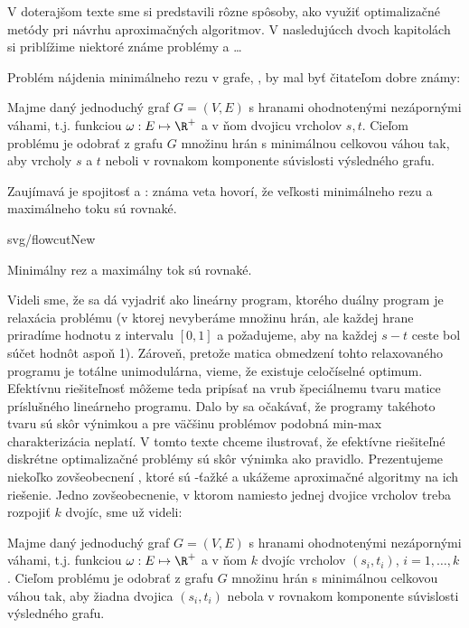 V doterajšom texte sme si predstavili rôzne spôsoby, ako využiť optimalizačné metódy pri návrhu aproximačných
algoritmov. V nasledujúcch dvoch kapitolách si priblížime niektoré známe problémy a \ldots


Problém nájdenia minimálneho rezu v grafe, \mincut, by mal byť čitateľom dobre známy:

\begin{framed}
  \begin{dfn}
    \label{dfn:mincut}
    Majme daný jednoduchý graf $G=(V,E)$ s hranami ohodnotenými nezápornými váhami, t.j. funkciou
    $\omega:E\mapsto \R^+$ a v ňom dvojicu vrcholov $s,t$. Cieľom problému
    \mincut je odobrať z grafu $G$ množinu hrán s minimálnou celkovou váhou tak, aby
     vrcholy $s$ a $t$ neboli v rovnakom komponente súvislosti výsledného grafu.
  \end{dfn}
\end{framed}

Zaujímavá je spojitosť \mincut a \maxflow: známa veta hovorí, že veľkosti minimálneho rezu a maximálneho toku 
sú rovnaké. 


\begin{myfig}{\textwidth}{svg/flowcutNew}
  \centerline{Minimálny rez a maximálny tok sú rovnaké.}
\end{myfig}

Videli sme, že \maxflow sa dá vyjadriť ako lineárny program, ktorého duálny program
je relaxácia problému \mincut (v ktorej nevyberáme množinu hrán, ale každej hrane priradíme hodnotu
z intervalu $[0,1]$ a požadujeme, aby na každej $s-t$ ceste bol súčet hodnôt aspoň 1).
Zároveň, pretože matica obmedzení tohto relaxovaného programu je totálne unimodulárna, vieme,
že existuje celočíselné optimum. Efektívnu riešiteľnosť \mincut môžeme teda pripísať na vrub
špeciálnemu tvaru matice príslušného lineárneho programu. Dalo by sa očakávať, 
že programy takéhoto tvaru sú skôr výnimkou a pre väčšinu problémov podobná min-max charakterizácia
neplatí. V tomto texte chceme ilustrovať, že efektívne riešiteľné 
diskrétne optimalizačné problémy sú skôr výnimka ako pravidlo.
Prezentujeme niekoľko zovšeobecnení \mincut, ktoré sú \NP-ťažké
a ukážeme aproximačné algoritmy na ich riešenie.
Jedno zovšeobecnenie, v ktorom namiesto jednej dvojice vrcholov treba rozpojiť $k$ dvojíc, sme už videli:


\begin{framed}
  \begin{dfn}
    \label{dfn:multicut}
    Majme daný jednoduchý graf $G=(V,E)$ s hranami ohodnotenými nezápornými váhami, t.j. funkciou
    $\omega:E\mapsto \R^+$ a v ňom $k$ dvojíc vrcholov $(s_i,t_i)$, $i=1,\ldots,k$. Cieľom problému
    \minmulticut je odobrať z grafu $G$ množinu hrán s minimálnou celkovou váhou tak, aby
    žiadna dvojica $(s_i,t_i)$ nebola v rovnakom komponente súvislosti výsledného grafu.
  \end{dfn}
\end{framed}

